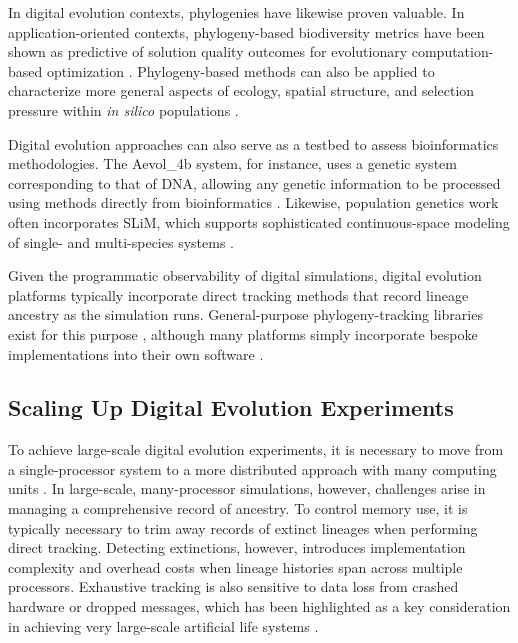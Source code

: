In digital evolution contexts, phylogenies have likewise proven valuable.
In application-oriented contexts, phylogeny-based biodiversity metrics have been shown as predictive of solution quality outcomes for evolutionary computation-based optimization \citep{hernandez2022phylogenetic}.
Phylogeny-based methods can also be applied to characterize more general aspects of ecology, spatial structure, and selection pressure within \textit{in silico} populations \citep{moreno2023toward}.

Digital evolution approaches can also serve as a testbed to assess bioinformatics methodologies.
The Aevol\_4b system, for instance, uses a genetic system corresponding to that of DNA, allowing any genetic information to be processed using methods directly from bioinformatics \citep{daudey2024aevol}.
Likewise, population genetics work often incorporates SLiM, which supports sophisticated continuous-space modeling of single- and multi-species systems \citep{haller2023slim}.

Given the programmatic observability of digital simulations, digital evolution platforms typically incorporate direct tracking methods that record lineage ancestry as the simulation runs.
General-purpose phylogeny-tracking libraries exist for this purpose \citep{dolson2024phylotrack}, although many platforms simply incorporate bespoke implementations into their own software \citep{ofria2004avida}.

\subsection{Scaling Up Digital Evolution Experiments} \label{sec:introduction:distributed}

To achieve large-scale digital evolution experiments, it is necessary to move from a single-processor system to a more distributed approach with many computing units \citep{moreno2024trackable}.
In large-scale, many-processor simulations, however, challenges arise in managing a comprehensive record of ancestry.
To control memory use, it is typically necessary to trim away records of extinct lineages when performing direct tracking.
Detecting extinctions, however, introduces implementation complexity and overhead costs when lineage histories span across multiple processors.
Exhaustive tracking is also sensitive to data loss from crashed hardware or dropped messages, which has been highlighted as a key consideration in achieving very large-scale artificial life systems \citep{ackley2016indefinite,ackley2014indefinitely}.

